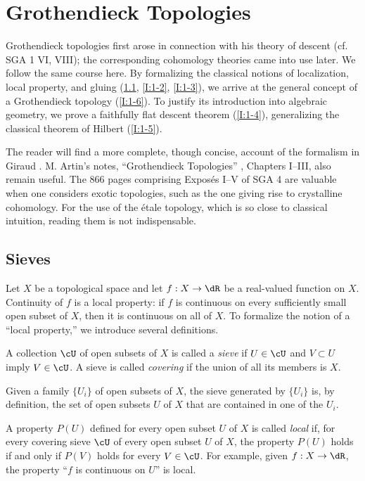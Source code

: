 \documentclass[12pt,oneside,english]{smfbook}
\begin{document}
\section{Grothendieck Topologies}\label{I:1}

Grothendieck topologies first arose in connection with his theory of descent (cf. SGA 1 VI, VIII); the corresponding cohomology theories came into use later. We follow the same course here. By formalizing the classical notions of localization, local property, and gluing (\ref{I:1-1}, \ref{I:1-2}, \ref{I:1-3}), we arrive at the general concept of a Grothendieck topology (\ref{I:1-6}). To justify its introduction into algebraic geometry, we prove a faithfully flat descent theorem (\ref{I:1-4}), generalizing the classical theorem of Hilbert (\ref{I:1-5}).

The reader will find a more complete, though concise, account of the formalism in Giraud \cite{gi64}. M. Artin's notes, ``Grothendieck Topologies'' \cite{ar62}, Chapters I--III, also remain useful. The 866 pages comprising Exposés I--V of SGA 4 are valuable when one considers exotic topologies, such as the one giving rise to crystalline cohomology. For the use of the étale topology, which is so close to classical intuition, reading them is not indispensable.

\subsection{Sieves}\label{I:1-1}

Let $X$ be a topological space and let $f:X\to \dR$ be a real-valued function on $X$. Continuity of $f$ is a local property: if $f$ is continuous on every sufficiently small open subset of $X$, then it is continuous on all of $X$. To formalize the notion of a ``local property,'' we introduce several definitions.

A collection $\cU$ of open subsets of $X$ is called a \emph{sieve} if $U\in\cU$ and $V\subset U$ imply $V\in\cU$. A sieve is called \emph{covering} if the union of all its members is $X$.

Given a family $\{U_i\}$ of open subsets of $X$, the sieve generated by $\{U_i\}$ is, by definition, the set of open subsets $U$ of $X$ that are contained in one of the $U_i$.

A property $P(U)$ defined for every open subset $U$ of $X$ is called \emph{local} if, for every covering sieve $\cU$ of every open subset $U$ of $X$, the property $P(U)$ holds if and only if $P(V)$ holds for every $V\in\cU$. For example, given $f:X\to\dR$, the property ``$f$ is continuous on $U$'' is local.
\end{document}
